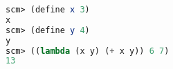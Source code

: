 \begin{lstlisting}[language=Scheme]
scm> (define x 3)
x
scm> (define y 4)
y
scm> ((lambda (x y) (+ x y)) 6 7)
13
\end{lstlisting}